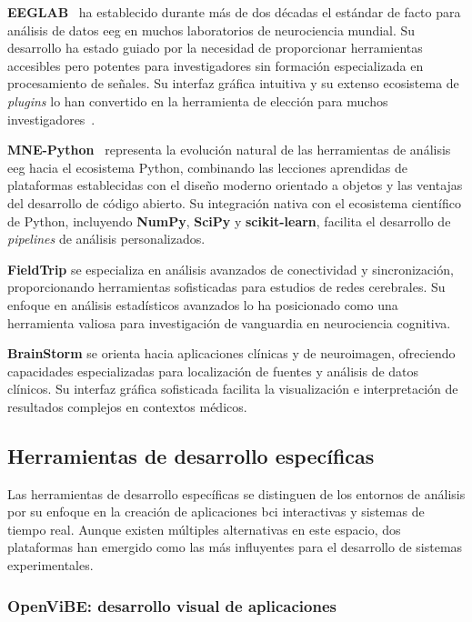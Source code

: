 \textbf{EEGLAB}~\cite{delorme2004eeglab} ha establecido durante más de dos décadas el estándar de facto para análisis de datos \acrshort{eeg} en muchos laboratorios de neurociencia mundial. Su desarrollo ha estado guiado por la necesidad de proporcionar herramientas accesibles pero potentes para investigadores sin formación especializada en procesamiento de señales. Su interfaz gráfica intuitiva y su extenso ecosistema de \textit{\gls{plugins}} lo han convertido en la herramienta de elección para muchos investigadores~\cite{tangermann2012review}.

\textbf{MNE-Python}~\cite{gramfort2013meg} representa la evolución natural de las herramientas de análisis \acrshort{eeg} hacia el ecosistema Python, combinando las lecciones aprendidas de plataformas establecidas con el diseño moderno orientado a objetos y las ventajas del desarrollo de código abierto. Su integración nativa con el ecosistema científico de Python, incluyendo \textbf{NumPy}, \textbf{SciPy} y \textbf{scikit-learn}, facilita el desarrollo de \textit{\glspl{pipeline}} de análisis personalizados.

\textbf{FieldTrip} se especializa en análisis avanzados de conectividad y sincronización, proporcionando herramientas sofisticadas para estudios de redes cerebrales. Su enfoque en análisis estadísticos avanzados lo ha posicionado como una herramienta valiosa para investigación de vanguardia en neurociencia cognitiva.

\textbf{BrainStorm} se orienta hacia aplicaciones clínicas y de neuroimagen, ofreciendo capacidades especializadas para localización de fuentes y análisis de datos clínicos. Su interfaz gráfica sofisticada facilita la visualización e interpretación de resultados complejos en contextos médicos.

\subsection{Herramientas de desarrollo específicas}
\label{subsec:herramientas_desarrollo}

Las herramientas de desarrollo específicas se distinguen de los entornos de análisis por su enfoque en la creación de aplicaciones \acrshort{bci} interactivas y sistemas de tiempo real. Aunque existen múltiples alternativas en este espacio, dos plataformas han emergido como las más influyentes para el desarrollo de sistemas experimentales.

\subsubsection{OpenViBE: desarrollo visual de aplicaciones}
\label{subsubsec:openvibe}

